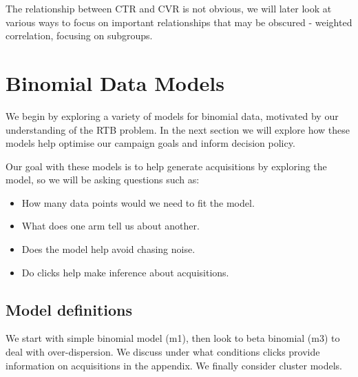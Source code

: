 \documentclass[11pt,a4,singlespacing,titlepagenumber=on]{scrreprt}
\numberwithin{equation}{chapter} %
\theoremstyle{remark}
\begin{document}
The relationship between CTR and CVR is not obvious, we will later look at various ways to focus on important relationships that may be obscured - weighted correlation, focusing on subgroups.


\chapter{Binomial Data Models}

We begin by exploring a variety of models for binomial data, motivated by our understanding of the RTB problem. In the next section we will explore how these models help optimise our campaign goals and inform decision policy.

Our goal with these models is to help generate acquisitions by exploring the model, so we will be asking questions such as:
\begin{itemize}
	\item How many data points would we need to fit the model.
	\item What does one arm tell us about another.
	\item Does the model help avoid chasing noise.
	\item Do clicks help make inference about acquisitions.
\end{itemize}





\section{Model definitions} 


We start with simple binomial model (m1), then look to beta binomial (m3) to deal with over-dispersion. We discuss under what conditions clicks provide information on acquisitions in the appendix. We finally consider cluster models.
\end{document}
